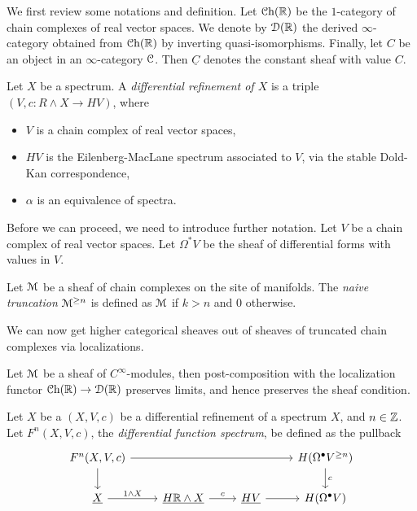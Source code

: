 \documentclass[10pt]{amsart}
\begin{document}
We first review some notations and definition. Let $\mathcal{C}\mathrm{h}(\mathbb{R})$ be the $1$-category of chain complexes of real vector spaces. We denote by $\mathcal{D}(\mathbb{R})$ the derived $\infty$-category obtained from $\mathcal{C}\mathrm{h}(\mathbb{R})$ by inverting quasi-isomorphisms. Finally, let $C$ be an object in an $\infty$-category $\mathcal{C}$. Then $\underline{C}$ denotes the constant sheaf with value $C$.

\begin{definition}
  Let $X$ be a spectrum. A \emph{differential refinement of $X$} is a triple $(V, c\colon R \wedge X \to HV)$, where 
  \begin{itemize}
    \item $V$ is a chain complex of real vector spaces,
    \item $HV$ is the Eilenberg-MacLane spectrum associated to $V$, via the stable Dold-Kan correspondence,
    \item $\alpha$ is an equivalence of spectra.
  \end{itemize}
\end{definition}

Before we can proceed, we need to introduce further notation. Let $V$ be a chain complex of real vector spaces. Let $\Omega^*V$ be the sheaf of differential forms with values in $V$. 

\begin{definition}
 Let $\mathcal{M}$ be a sheaf of chain complexes on the site of manifolds. The \emph{naive truncation} $\mathcal{M}^{\geq n}$ is defined as $\mathcal{M}$ if $k > n$ and $0$ otherwise.
\end{definition}

We can now get higher categorical sheaves out of sheaves of truncated chain complexes via localizations.

\begin{lemma}
  Let $\mathcal{M}$ be a sheaf of $C^\infty$-modules, then post-composition with the localization functor $\mathcal{C}\mathrm{h}(\mathbb{R}) \to \mathcal{D}(\mathbb{R})$ preserves limits, and hence preserves the sheaf condition.
\end{lemma}

\begin{definition}
  Let $X$ be a $(X,V,c)$ be a differential refinement of a spectrum $X$, and $n \in \mathbb{Z}$. Let $F^n(X,V,c)$, the \emph{differential function spectrum}, be defined as the pullback
  \[
  \begin{tikzcd}
    F^n(X,V,c) \arrow[rrr] \arrow[d] & & & H(\Omega^\bullet V^{\geq n}) \arrow[d, "c"] \\
    \underline{X} \arrow[r, "1 \wedge X"] & \underline{H\bR \wedge X} \arrow[r, "c"] &  \underline{HV} \arrow[r] & H(\Omega^\bullet V)
  \end{tikzcd}
  \]   
\end{definition}
\end{document}
